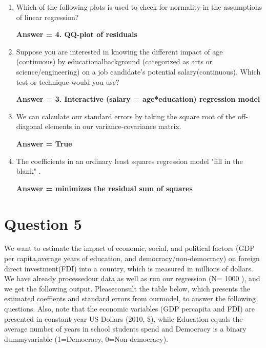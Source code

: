 \documentclass[12pt,letterpaper]{article}
\begin{document}
\begin{enumerate}
	\item Which of the following plots is used to check for normality in the assumptions of linear regression?
	
	\textbf{Answer = 4. QQ-plot of residuals}
	
	\item Suppose you are interested in knowing the different impact of age (continuous) by educationalbackground (categorized as arts or science/engineering) on a job candidate’s potential salary(continuous). Which test or technique would you use?
	
	\textbf{Answer = 3. Interactive (salary = age*education) regression model}
	
	\item We can calculate our standard errors by taking the square root of the off-diagonal elements in our variance-covariance matrix.
	
	\textbf{Answer = True}
	
	\item The coefficients in an ordinary least squares regression model "fill in the blank" .

	\textbf{Answer = minimizes the residual sum of squares}

\end{enumerate}  

\newpage

		\section*{Question 5}
\vspace{.25cm}
\noindent 
We want to estimate the impact of economic, social, and political factors (GDP per capita,average years of education, and democracy/non-democracy) on foreign direct investment(FDI) into a country, which is measured in millions of dollars. We have already processedour data as well as run our regression (N= 1000 ), and we get the following output. Pleaseconsult the table below, which presents the estimated coeffients and standard errors from ourmodel, to answer the following questions. Also, note that the economic variables (GDP percapita and FDI) are presented in constant-year US Dollars (2010, \$), while Education equals the average number of years in school students spend and Democracy is a binary dummyvariable (1=Democracy, 0=Non-democracy).
\end{document}
